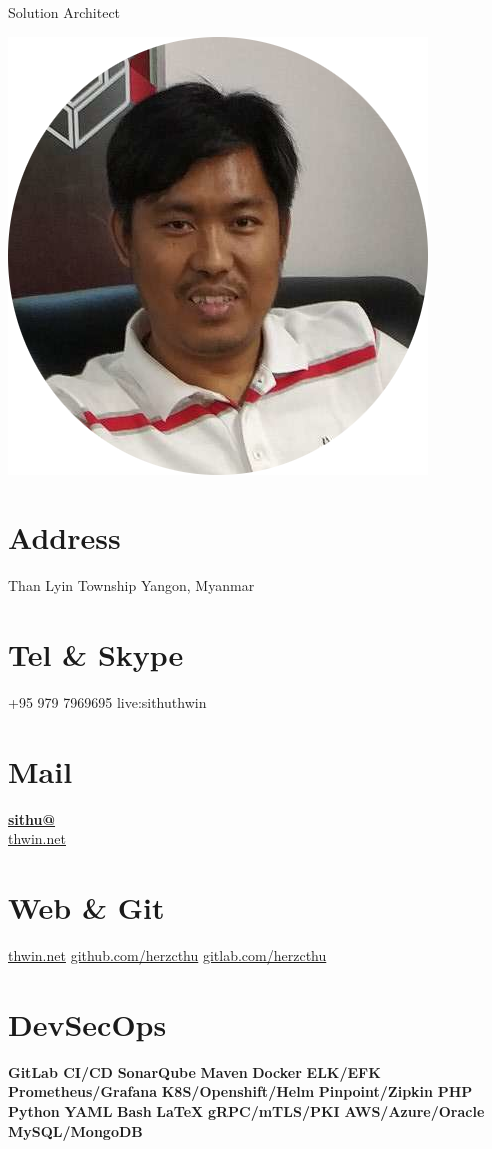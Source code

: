\documentclass[]{friggeri-cv}
\begin{document}
      {Solution Architect}
      

\begin{aside}
  \includegraphics[scale=1]{img/myself-circle.png}
  \section{Address}
    Than Lyin Township
    Yangon, Myanmar
    ~
  \section{Tel \& Skype}
    +95 979 7969695
    live:sithuthwin
    ~
  \section{Mail}
    \href{mailto:sithu@thwin.net}{\textbf{sithu@}\\thwin.net}
    ~
  \section{Web \& Git}
    \href{https://www.thwin.net}{thwin.net}
    \href{https://github.com/herzcthu}{github.com/herzcthu}
    \href{https://gitlab.com/herzcthu}{gitlab.com/herzcthu}
    ~
  \section{DevSecOps}
  	\textbf{GitLab CI/CD}
  	\textbf{SonarQube}
  	\textbf{Maven}
  	\textbf{Docker}
  	\textbf{ELK/EFK}
  	\textbf{Prometheus/Grafana}
  	\textbf{K8S/Openshift/Helm}
  	\textbf{Pinpoint/Zipkin}
    \textbf{PHP}
    \textbf{Python}
    \textbf{YAML}
    \textbf{Bash}
    \textbf{LaTeX}
    \textbf{gRPC/mTLS/PKI}
    \textbf{AWS/Azure/Oracle}
    \textbf{MySQL/MongoDB}
    ~
\end{aside}
~
\end{document}
